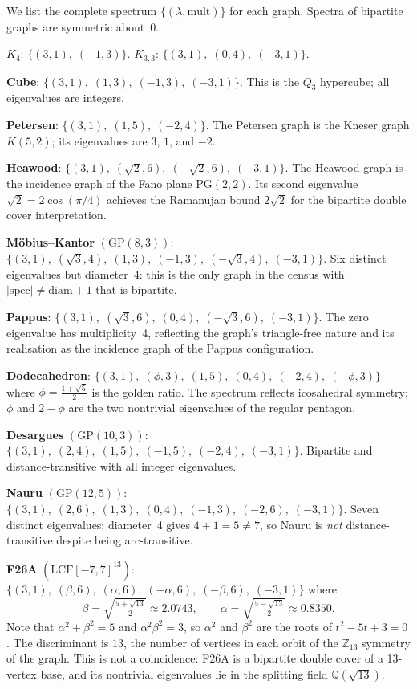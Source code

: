 \documentclass[11pt,a4paper]{article}
\begin{document}
We list the complete spectrum $\{(\lambda, \text{mult})\}$ for each graph. Spectra of bipartite graphs are symmetric about~$0$.

\bigskip
\noindent
$K_4$: $\{(3, 1),\; (-1, 3)\}$. \quad
$K_{3,3}$: $\{(3, 1),\; (0, 4),\; (-3, 1)\}$.

\medskip
\noindent
\textbf{Cube}: $\{(3,1),\; (1,3),\; (-1,3),\; (-3,1)\}$. This is the $Q_3$ hypercube; all eigenvalues are integers.

\medskip
\noindent
\textbf{Petersen}: $\{(3,1),\; (1,5),\; (-2,4)\}$. The Petersen graph is the Kneser graph $K(5,2)$; its eigenvalues are $3$, $1$, and $-2$.

\medskip
\noindent
\textbf{Heawood}: $\{(3,1),\; (\sqrt{2},6),\; (-\sqrt{2},6),\; (-3,1)\}$. The Heawood graph is the incidence graph of the Fano plane $\mathrm{PG}(2,2)$. Its second eigenvalue $\sqrt{2} = 2\cos(\pi/4)$ achieves the Ramanujan bound $2\sqrt{2}$ for the bipartite double cover interpretation.

\medskip
\noindent
\textbf{M\"{o}bius--Kantor} $(\mathrm{GP}(8,3))$: $\{(3,1),\; (\sqrt{3},4),\; (1,3),\; (-1,3),\; (-\sqrt{3},4),\; (-3,1)\}$. Six distinct eigenvalues but diameter~4: this is the only graph in the census with $|\mathrm{spec}| \neq \mathrm{diam}+1$ that is bipartite.

\medskip
\noindent
\textbf{Pappus}: $\{(3,1),\; (\sqrt{3},6),\; (0,4),\; (-\sqrt{3},6),\; (-3,1)\}$. The zero eigenvalue has multiplicity~4, reflecting the graph's triangle-free nature and its realisation as the incidence graph of the Pappus configuration.

\medskip
\noindent
\textbf{Dodecahedron}: $\{(3,1),\; (\phi,3),\; (1,5),\; (0,4),\; (-2,4),\; (-\phi,3)\}$ where $\phi = \tfrac{1+\sqrt{5}}{2}$ is the golden ratio. The spectrum reflects icosahedral symmetry; $\phi$ and $2-\phi$ are the two nontrivial eigenvalues of the regular pentagon.

\medskip
\noindent
\textbf{Desargues} $(\mathrm{GP}(10,3))$: $\{(3,1),\; (2,4),\; (1,5),\; (-1,5),\; (-2,4),\; (-3,1)\}$. Bipartite and distance-transitive with all integer eigenvalues.

\medskip
\noindent
\textbf{Nauru} $(\mathrm{GP}(12,5))$: $\{(3,1),\; (2,6),\; (1,3),\; (0,4),\; (-1,3),\; (-2,6),\; (-3,1)\}$. Seven distinct eigenvalues; diameter~4 gives $4+1=5 \neq 7$, so Nauru is \emph{not} distance-transitive despite being arc-transitive.

\medskip
\noindent
\textbf{F26A} $(\mathrm{LCF}[-7,7]^{13})$: $\{(3,1),\; (\beta,6),\; (\alpha,6),\; (-\alpha,6),\; (-\beta,6),\; (-3,1)\}$
where
\[
\beta = \sqrt{\tfrac{5+\sqrt{13}}{2}} \approx 2.0743, \qquad \alpha = \sqrt{\tfrac{5-\sqrt{13}}{2}} \approx 0.8350.
\]
Note that $\alpha^2 + \beta^2 = 5$ and $\alpha^2\beta^2 = 3$, so $\alpha^2$ and $\beta^2$ are the roots of $t^2 - 5t + 3 = 0$. The discriminant is $13$, the number of vertices in each orbit of the $\mathbb{Z}_{13}$ symmetry of the graph. This is not a coincidence: F26A is a bipartite double cover of a 13-vertex base, and its nontrivial eigenvalues lie in the splitting field $\mathbb{Q}(\sqrt{13})$.
\end{document}
